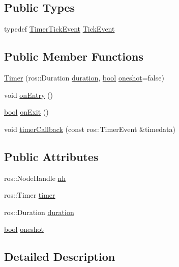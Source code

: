 \subsection*{Public Types}
\begin{DoxyCompactItemize}
\item 
typedef \hyperlink{structsmacc_1_1TimerTickEvent}{Timer\+Tick\+Event} \hyperlink{classsmacc_1_1Timer_a6f72664250a9ee757619db1605529b98}{Tick\+Event}
\end{DoxyCompactItemize}
\subsection*{Public Member Functions}
\begin{DoxyCompactItemize}
\item 
\hyperlink{classsmacc_1_1Timer_afcfaad17f6105255a438b2b442bd0cdf}{Timer} (ros\+::\+Duration \hyperlink{classsmacc_1_1Timer_a564c0bbd2b12909d61a1345358c641fc}{duration}, \hyperlink{classbool}{bool} \hyperlink{classsmacc_1_1Timer_a8b460b006b7173f718dfa5868c0eb59d}{oneshot}=false)
\item 
void \hyperlink{classsmacc_1_1Timer_ab99111438ad35cf740ed4bd8c136ff6a}{on\+Entry} ()
\item 
\hyperlink{classbool}{bool} \hyperlink{classsmacc_1_1Timer_a5984dee1815d8626f7728c08aa7c6278}{on\+Exit} ()
\item 
void \hyperlink{classsmacc_1_1Timer_a3939cbeb19e5a7d9c02c56064805b242}{timer\+Callback} (const ros\+::\+Timer\+Event \&timedata)
\end{DoxyCompactItemize}
\subsection*{Public Attributes}
\begin{DoxyCompactItemize}
\item 
ros\+::\+Node\+Handle \hyperlink{classsmacc_1_1Timer_a84b2854ae319292c9351325d98615a66}{nh}
\item 
ros\+::\+Timer \hyperlink{classsmacc_1_1Timer_a1376795baefaab38614fc108aeb4f36c}{timer}
\item 
ros\+::\+Duration \hyperlink{classsmacc_1_1Timer_a564c0bbd2b12909d61a1345358c641fc}{duration}
\item 
\hyperlink{classbool}{bool} \hyperlink{classsmacc_1_1Timer_a8b460b006b7173f718dfa5868c0eb59d}{oneshot}
\end{DoxyCompactItemize}


\subsection{Detailed Description}


